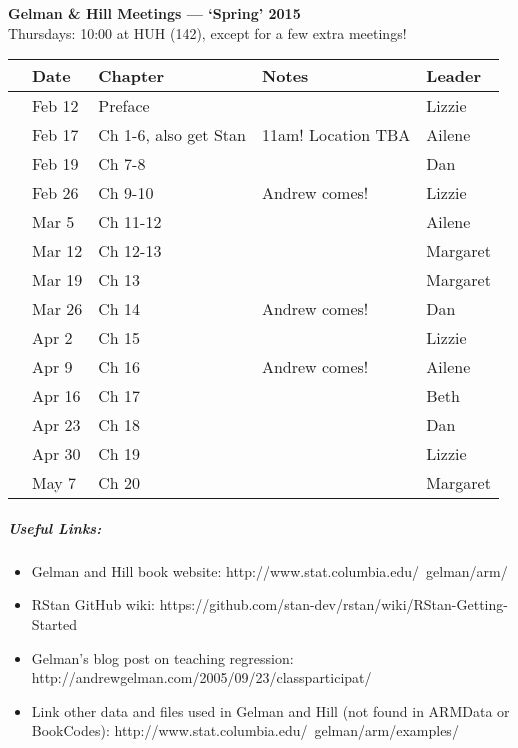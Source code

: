 \documentclass[11pt]{article}
\begin{document}
 
\raggedright
{}

\begin{center} 
{\large \textbf{Gelman \& Hill Meetings --- `Spring' 2015}} \\ [2pt]
Thursdays: 10:00 at HUH (142), except for a few extra meetings!\\
\end{center} 

\begin{center}
\begin{tabular}{ p{0.7 cm}  p{1.5 cm}  p{5 cm}  p{5 cm}  p{1.5 cm} }  \hline \hline
 & \textbf{Date}
   & \textbf{Chapter}
      & \textbf{Notes} 
         & \textbf{Leader} \\ 
\hline \hline
 & Feb 12  &  Preface&        & Lizzie \\\hline
 & Feb 17  & Ch 1-6, also get Stan   &  11am! Location TBA & Ailene  \\\hline
 & Feb 19  & Ch 7-8 &      & Dan \\\hline
 & Feb 26 & Ch 9-10 &  Andrew comes! & Lizzie  \\\hline
 & Mar 5 & Ch 11-12 &        & Ailene   \\\hline
 & Mar 12 & Ch 12-13 &  & Margaret \\\hline
 & Mar 19 & Ch 13 &        & Margaret \\\hline
 & Mar 26 & Ch 14 &  Andrew comes! & Dan  \\\hline
 & Apr 2& Ch 15   &  & Lizzie  \\\hline
 & Apr 9 & Ch 16   &  Andrew comes!& Ailene  \\\hline
 & Apr 16 &Ch 17 &  & Beth  \\\hline
 & Apr 23 & Ch 18      & & Dan \\\hline
 & Apr 30& Ch 19  & & Lizzie\\\hline
 & May 7& Ch 20  & & Margaret \\\hline

\hline
\end{tabular}
\end{center}
\subparagraph{Useful Links:} 
\begin{itemize}
\item Gelman and Hill book website: http://www.stat.columbia.edu/~gelman/arm/
\item RStan GitHub wiki: https://github.com/stan-dev/rstan/wiki/RStan-Getting-Started
\item Gelman's blog post on teaching regression: http://andrewgelman.com/2005/09/23/classparticipat/
\item Link other data and files used in Gelman and Hill (not found in ARMData or BookCodes): http://www.stat.columbia.edu/~gelman/arm/examples/
\end{itemize}
\end{document}
